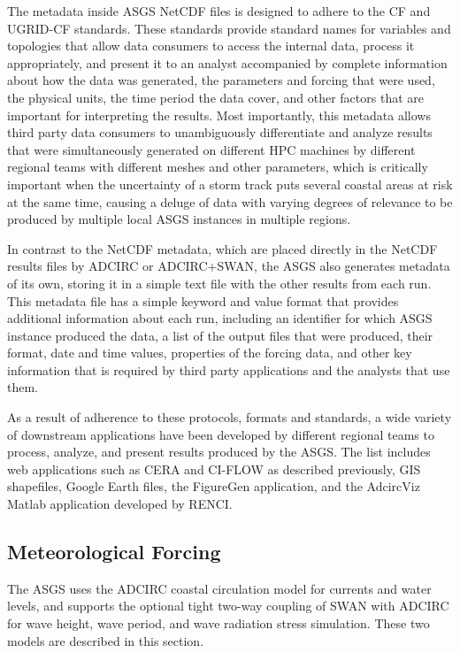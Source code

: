 \documentclass[jmse,article,submit,moreauthors,pdftex,12pt,a4paper]{mdpi}
\begin{document}
The metadata inside ASGS NetCDF files is designed to adhere to the 
CF and UGRID-CF standards. These standards provide standard names 
for variables and topologies that allow data consumers to access the 
internal data, process it appropriately, and present it to an 
analyst accompanied by complete information about how the data was 
generated, the parameters and forcing that were used, the physical 
units, the time period the data cover, and other factors that are 
important for interpreting the results. Most importantly, this 
metadata allows third party data consumers to unambiguously 
differentiate and analyze results that were simultaneously generated 
on different HPC machines by different regional teams with different 
meshes and other parameters, which is critically important when the 
uncertainty of a storm track puts several coastal areas at risk at 
the same time, causing a deluge of data with varying degrees of 
relevance to be produced by multiple local ASGS instances in multiple
regions. 

In contrast to the NetCDF metadata, which are placed directly in the 
NetCDF results files by ADCIRC or ADCIRC+SWAN, the ASGS also 
generates metadata of its own, storing it in a simple text file with 
the other results from each run. This metadata file has a simple 
keyword and value format that provides additional information about 
each run, including an identifier for which ASGS instance produced 
the data, a list of the output files that were produced, their 
format, date and time values, properties of the forcing data, and 
other key information that is required by third party applications 
and the analysts that use them. 

As a result of adherence to these protocols, formats and standards, 
a wide variety of downstream applications have been developed by 
different regional teams to process, analyze, and present results 
produced by the ASGS. The list includes web applications such as 
CERA and CI-FLOW\cite{VanCootenS2011} as described previously, GIS shapefiles, Google 
Earth files, the FigureGen\cite{DietrichJC2013} application, and the 
AdcircViz Matlab application developed by RENCI.

\subsection{Meteorological Forcing}

The ASGS uses the ADCIRC coastal circulation model for currents and 
water levels, and supports the optional tight two-way coupling of 
SWAN with ADCIRC for wave height, wave period, and wave radiation 
stress simulation. These two models are described in this section. 
\end{document}
